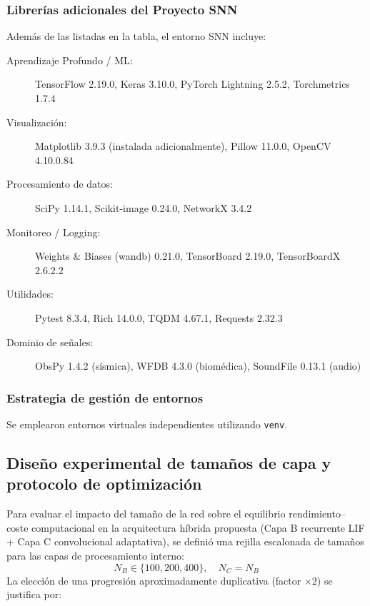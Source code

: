 \subsubsection*{Librerías adicionales del Proyecto SNN}
Además de las listadas en la tabla, el entorno SNN incluye:

\begin{description}
    \item[Aprendizaje Profundo / ML:] TensorFlow 2.19.0, Keras 3.10.0, PyTorch Lightning 2.5.2, Torchmetrics 1.7.4
    \item[Visualización:] Matplotlib 3.9.3 (instalada adicionalmente), Pillow 11.0.0, OpenCV 4.10.0.84
    \item[Procesamiento de datos:] SciPy 1.14.1, Scikit-image 0.24.0, NetworkX 3.4.2
    \item[Monitoreo / Logging:] Weights \& Biases (wandb) 0.21.0, TensorBoard 2.19.0, TensorBoardX 2.6.2.2
    \item[Utilidades:] Pytest 8.3.4, Rich 14.0.0, TQDM 4.67.1, Requests 2.32.3
    \item[Dominio de señales:] ObsPy 1.4.2 (sísmica), WFDB 4.3.0 (biomédica), SoundFile 0.13.1 (audio)
\end{description}


\subsubsection*{Estrategia de gestión de entornos}
Se emplearon entornos virtuales independientes utilizando \texttt{venv}. 

\subsection{Diseño experimental de tamaños de capa y protocolo de optimización}
\label{subsec:diseno-experimental-neuronas}

Para evaluar el impacto del tamaño de la red sobre el equilibrio rendimiento--coste computacional en la arquitectura híbrida propuesta (Capa B recurrente LIF + Capa C convolucional adaptativa), se definió una rejilla escalonada de tamaños para las capas de procesamiento interno:
\[
N_B \in \{100, 200, 400\}, \quad N_C = N_B
\]
La elección de una progresión aproximadamente duplicativa (factor $\times 2$) se justifica por:

